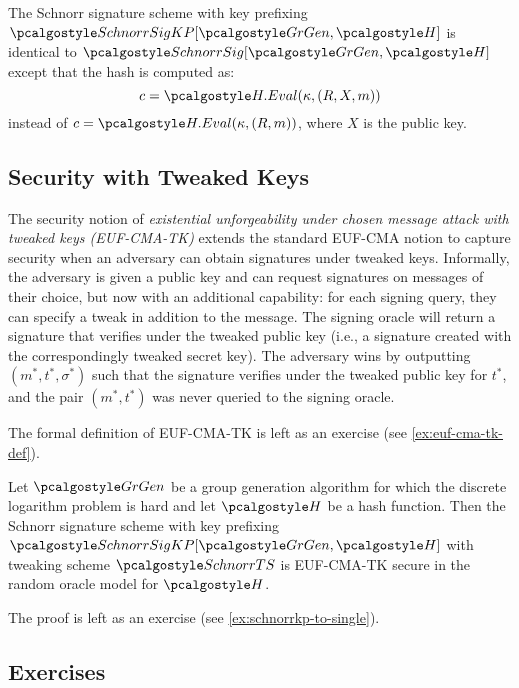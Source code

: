 \begin{definition}\label{def:schnorr-kp}
  The Schnorr signature scheme with key prefixing $\algo{SchnorrSigKP}[\grgen, \algo{H}]$ is identical to $\algo{SchnorrSig}[\grgen, \algo{H}]$ except that the hash is computed as:
  \[
    c = \algo{H.Eval}(\kappa, (R, X, m))
  \]
  instead of $c = \algo{H.Eval}(\kappa, (R, m))$, where $X$ is the public key.
\end{definition}

\subsection{Security with Tweaked Keys}

The security notion of \emph{existential unforgeability under chosen message attack with tweaked keys (EUF-CMA-TK)} extends the standard EUF-CMA notion to capture security when an adversary can obtain signatures under tweaked keys.
Informally, the adversary is given a public key and can request signatures on messages of their choice, but now with an additional capability: for each signing query, they can specify a tweak in addition to the message.
The signing oracle will return a signature that verifies under the tweaked public key (i.e., a signature created with the correspondingly tweaked secret key).
The adversary wins by outputting $(m^*, t^*, \sigma^*)$ such that the signature verifies under the tweaked public key for $t^*$, and the pair $(m^*, t^*)$ was never queried to the signing oracle.

The formal definition of EUF-CMA-TK is left as an exercise (see \autoref{ex:euf-cma-tk-def}).

\begin{theorem}\label{thm:schnorrkp-euf-cma-tk}
  Let $\grgen$ be a group generation algorithm for which the discrete logarithm problem is hard and let $\algo{H}$ be a hash function.
  Then the Schnorr signature scheme with key prefixing $\algo{SchnorrSigKP}[\grgen, \algo{H}]$ with tweaking scheme $\algo{SchnorrTS}$ is EUF-CMA-TK secure in the random oracle model for $\algo{H}$.
\end{theorem}

The proof is left as an exercise (see \autoref{ex:schnorrkp-to-single}).

\subsection{Exercises}

